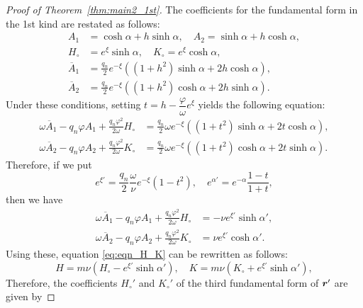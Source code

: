 \documentclass[10pt,a4paper]{amsart}
\def\br{\mbox{\boldmath $r$}}
\begin{document}
\begin{proof}[Proof of Theorem~\ref{thm:main2_1st}]
The coefficients for the fundamental form in the 1st kind are restated as follows:
\begin{equation}
\begin{aligned}
A_1 &= \cosh \alpha + h \sinh \alpha, \quad
A_2 = \sinh \alpha + h \cosh \alpha,\\
H_\circ &= e^\xi \sinh \alpha, \quad
K_\circ = e^\xi \cosh \alpha,\\
\overline{A}_1 &= \frac{q_n}{2} e^{-\xi} ((1+h^2)\sinh \alpha + 2h \cosh \alpha),\\
\overline{A}_2 &= \frac{q_n}{2} e^{-\xi} ((1+h^2)\cosh \alpha + 2h \sinh \alpha).
\end{aligned}
\end{equation}
Under these conditions, setting $t = h - \dfrac{\varphi}{\omega} e^\xi$ yields the following equation:
\begin{equation}
\begin{aligned}
\omega \overline{A}_1 - q_n \varphi A_1 + \frac{q_n \varphi^2}{2\omega} H_\circ
&= \frac{q_n}{2} \omega e^{-\xi} ((1+t^2) \sinh \alpha + 2t \cosh \alpha),\\
\omega \overline{A}_2 - q_n \varphi A_2 + \frac{q_n \varphi^2}{2\omega} K_\circ
&= \frac{q_n}{2} \omega e^{-\xi} ((1+t^2) \cosh \alpha + 2t \sinh \alpha).
\end{aligned}
\end{equation}
Therefore, if we put
\begin{equation}
e^{\xi'} = \frac{q_n}{2} \frac{\omega}{\nu} e^{-\xi} (1-t^2), \quad
e^{\alpha'} = e^{-\alpha} \frac{1-t}{1+t},
\end{equation}
then we have
\begin{equation}
\begin{aligned}
\omega \overline{A}_1 - q_n \varphi A_1 + \frac{q_n \varphi^2}{2\omega} H_\circ
&= -\nu e^{\xi'} \sinh \alpha',\\
\omega \overline{A}_2 - q_n \varphi A_2 + \frac{q_n \varphi^2}{2\omega} K_\circ
&= \nu e^{\xi'} \cosh \alpha'.
\end{aligned}
\end{equation}
Using these, equation \eqref{eq:eqn_H_K} can be rewritten as follows:
\begin{equation}
H = m\nu (H_\circ - e^{\xi'} \sinh \alpha'), \quad
K = m\nu (K_\circ + e^{\xi'} \sinh \alpha'),
\end{equation}
Therefore, the coefficients $H_\circ'$ and $K_\circ'$ of the third fundamental form of $\br'$ are given by

\end{proof}
\end{document}
